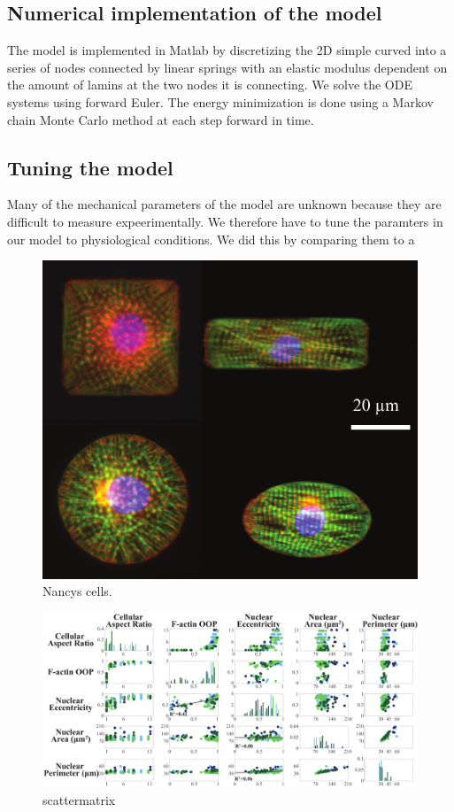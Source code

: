 \subsection{Numerical implementation of the model}

The model is implemented in Matlab by discretizing the 2D simple curved into a series of nodes connected by linear springs with an elastic modulus dependent on the amount of lamins at the two nodes it is connecting. We solve the ODE systems using forward Euler. The energy minimization is done using a Markov chain Monte Carlo method at each step forward in time. 

\subsection{Tuning the model}

Many of the mechanical parameters of the model are unknown because they are difficult to measure expeerimentally. We therefore have to tune the paramters in our model to physiological conditions. We did this by comparing them to a  
\begin{figure}[h]
\centering
\captionsetup{width=.9\linewidth}
\includegraphics[width=4.5in]{Project3/figs/nancycells.pdf}
\caption{Nancys cells.}
\label{fig::nancycells}
\end{figure}


\begin{figure}[h]
\centering
\captionsetup{width=.9\linewidth}
\includegraphics[width=6in]{Project3/figs/Nancy_data.pdf}
\caption{scattermatrix}
\label{fig::scattermatrix}
\end{figure}


